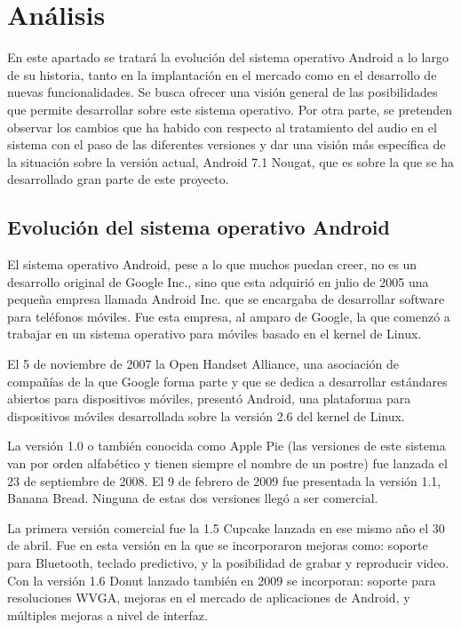 \chapter{Análisis}
En este apartado se tratará la evolución del sistema operativo Android a lo largo de su historia, tanto en la implantación en el mercado como en el desarrollo de nuevas funcionalidades. Se busca ofrecer una visión general de las posibilidades que permite desarrollar sobre este sistema operativo. Por otra parte, se pretenden observar los cambios que ha habido con respecto al tratamiento del audio en el sistema con el paso de las diferentes versiones y dar una visión más específica de la situación sobre la versión actual, Android 7.1 Nougat, que es sobre la que se ha desarrollado gran parte de este proyecto.


\section{Evolución del sistema operativo Android}
El sistema operativo Android, pese a lo que muchos puedan creer, no es un desarrollo original de Google Inc., sino que esta adquirió en julio de 2005 una pequeña empresa llamada Android Inc. que se encargaba de desarrollar software para teléfonos móviles. Fue esta empresa, al amparo de Google, la que comenzó a trabajar en un sistema operativo para móviles basado en el kernel de Linux.

El 5 de noviembre de 2007 la Open Handset Alliance, una asociación de compañías de la que Google forma parte y que se dedica a desarrollar estándares abiertos para dispositivos móviles, presentó Android, una plataforma para dispositivos móviles desarrollada sobre la versión 2.6 del kernel de Linux.

La versión 1.0 o también conocida como Apple Pie (las versiones de este sistema van por orden alfabético y tienen siempre el nombre de un postre) fue lanzada el 23 de septiembre de 2008. El 9 de febrero de 2009 fue presentada la versión 1.1, Banana Bread. Ninguna de estas dos versiones llegó a ser comercial.

La primera versión comercial fue la 1.5 Cupcake lanzada en ese mismo año el 30 de abril. Fue en esta versión en la que se incorporaron mejoras como: soporte para Bluetooth, teclado predictivo, y la posibilidad de grabar y reproducir video. Con la versión 1.6 Donut lanzado también en 2009 se incorporan: soporte para resoluciones \gls{WVGA}, mejoras en el mercado de aplicaciones de Android, y múltiples mejoras a nivel de interfaz.

